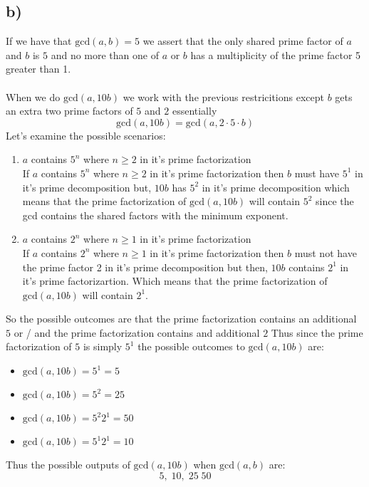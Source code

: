 \documentclass{article}
\begin{document}
\subsection*{b)}
If we have that $\text{gcd}(a,b)=5$ we assert that the only shared prime factor of $a$ and $b$ is $5$ and no more than one of $a$ or $b$ has a multiplicity of the prime factor 5 greater than 1.\\\\
When we do $\text{gcd}(a,10b)$ we work with the previous restricitions except $b$ gets an extra two prime factors of $5$ and $2$ essentially $$\text{gcd}(a,10b)=\text{gcd}(a,2\cdot 5\cdot b)$$
Let's examine the possible scenarios:
\begin{enumerate}[i]
  \item $a$ contains $5^{n}$ where $n\geq 2$ in it's prime factorization\\
  If $a$ contains $5^{n}$ where $n\geq 2$ in it's prime factorization then $b$ must have $5^{1}$ in it's prime decomposition but, $10b$ has $5^{2}$ in it's prime decomposition which means
  that the prime factorization of $\text{gcd}(a,10b)$ will contain $5^{2}$ since the gcd contains the shared factors with the minimum exponent. 
  \item $a$ contains $2^{n}$ where $n\geq 1$ in it's prime factorization\\
  If $a$ contains $2^{n}$ where $n\geq 1$ in it's prime factorization then $b$ must not have the prime factor 2 in it's prime decomposition but then, $10b$ contains $2^{1}$ in it's prime factorizartion.
  Which means that the prime factorization of $\text{gcd}(a,10b)$ will contain $2^{1}$.
\end{enumerate}
So the possible outcomes are that the prime factorization contains an additional $5$ or / and the prime factorization contains and additional $2$
Thus since the prime factorization of $5$ is simply $5^{1}$ the possible outcomes to $\text{gcd}(a,10b)$ are:
\begin{itemize}
    \item {$\text{gcd}(a,10b)=5^{1}=5$}
    \item {$\text{gcd}(a,10b)=5^{2}=25$}
    \item {$\text{gcd}(a,10b)=5^{2}2^{1}=50$}
    \item {$\text{gcd}(a,10b)=5^{1}2^{1}=10$}
\end{itemize}
Thus the possible outputs of $\text{gcd}(a,10b)$ when $\text{gcd}(a,b)$ are: $$5,\;10,\;25\;50$$
\end{document}
